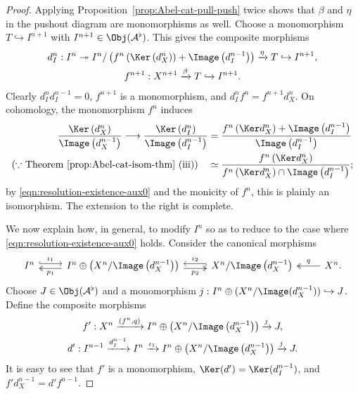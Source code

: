 \begin{proof}
	Applying Proposition~\ref{prop:Abel-cat-pull-push} twice shows that $\beta$
	and $\eta$ in the pushout diagram are monomorphisms as well. Choose a
	monomorphism $T\hookrightarrow I^{n+1}$ with
	$I^{n+1}\in\Obj(\mathcal{A}^\flat)$. This gives the composite morphisms
	\begin{gather*}
		d_I^n: I^n \twoheadrightarrow I^n / \left( f^n \left( \Ker\left( d_X^n \right) \right) + \Image\left( d_I^{n-1}\right) \right) \xrightarrow{\eta} T \hookrightarrow I^{n+1}, \\
		f^{n+1}: X^{n+1} \xrightarrow{\beta} T \hookrightarrow I^{n+1}.
	\end{gather*}
	Clearly $d_I^nd_I^{n-1}=0$, $f^{n+1}$ is a monomorphism, and
	$d_I^nf^n=f^{n+1}d_X^n$. On cohomology, the monomorphism $f^n$ induces
	\begin{align*}
		\frac{\Ker\left( d_X^n \right)}{\Image\left( d_X^{n-1} \right)} \longrightarrow \frac{\Ker\left( d_I^n \right)}{\Image\left( d_I^{n-1} \right)} & =  \frac{ f^n\left(\Ker d_X^n \right) + \Image\left( d_I^{n-1} \right)}{ \Image\left(d_I^{n-1}\right) } \\
		\text{($\because$ Theorem \ref{prop:Abel-cat-isom-thm} (iii))} \quad & \simeq \frac{ f^n\left(\Ker d_X^n \right) }{ f^n\left(\Ker d_X^n \right) \cap \Image\left(d_I^{n-1}\right) };
	\end{align*}
	by \eqref{eqn:resolution-existence-aux0} and the monicity of $f^n$, this is
	plainly an isomorphism. The extension to the right is complete.

	We now explain how, in general, to modify $I^n$ so as to reduce to the case
	where \eqref{eqn:resolution-existence-aux0} holds. Consider the canonical
	morphisms
	\[\begin{tikzcd}
		I^n \arrow[hookrightarrow, shift left, r, "\iota_1"] & I^n \oplus \left( X^n / \Image\left( d_X^{n-1} \right) \right) \arrow[twoheadrightarrow, shift left, l, "p_1"] \arrow[twoheadrightarrow, shift right, r, "p_2"'] & X^n / \Image\left( d_X^{n-1} \right) \arrow[hookrightarrow, shift right, l, "\iota_2"'] & X^n \arrow[twoheadrightarrow, l, "q"'] .
	\end{tikzcd}\]
	Choose $J\in\Obj(\mathcal{A}^\flat)$ and a monomorphism
	$j:I^n\oplus(X^n/\Image(d_X^{n-1}))\hookrightarrow J$. Define the
	composite morphisms
	\begin{gather*}
		f' : X^n \xrightarrow{(f^n, q)} I^n \oplus \left( X^n / \Image\left( d_X^{n-1} \right) \right) \xrightarrow{j} J, \\
		d': I^{n-1} \xrightarrow{d_I^{n-1}} I^n \xrightarrow{\iota_1} I^n \oplus \left( X^n / \Image\left( d_X^{n-1} \right) \right) \xrightarrow{j} J.
	\end{gather*}
	It is easy to see that $f'$ is a monomorphism,
	$\Ker(d')=\Ker(d_I^{n-1})$, and $f'd_X^{n-1}=d'f^{n-1}$.


\end{proof}
